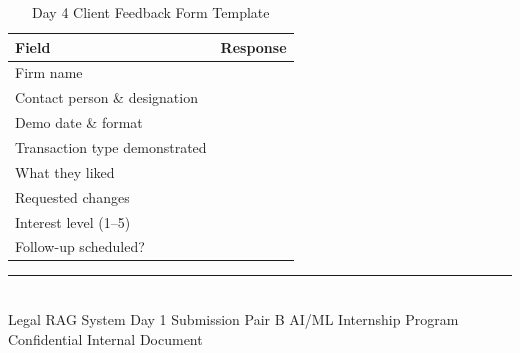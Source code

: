 \documentclass[12pt, a4paper]{article}
\begin{document}
\begin{table}[H]
\centering
\caption{Day 4 Client Feedback Form Template}
\renewcommand{\arraystretch}{1.5}
\begin{tabularx}{\textwidth}{lX}
\toprule
\textbf{Field} & \textbf{Response} \\
\midrule
Firm name                           & \\
Contact person \& designation       & \\
Demo date \& format                 & \\
Transaction type demonstrated       & \\
What they liked                     & \\
Requested changes                   & \\
Interest level (1--5)               & \\
Follow-up scheduled?                & \\
\bottomrule
\end{tabularx}
\end{table}


\vspace{1.5cm}
\vfill

\begin{center}
    {\color{primary}\rule{0.55\textwidth}{0.5pt}}\\[0.35cm]
    {\small\color{darkgray}
    Legal RAG System \textperiodcentered{}
    Day 1 Submission \textperiodcentered{}
    Pair B \textperiodcentered{}
    AI/ML Internship Program}\\[0.15cm]
    {\small\color{darkgray} Confidential \textperiodcentered{} Internal Document}
\end{center}
\end{document}
